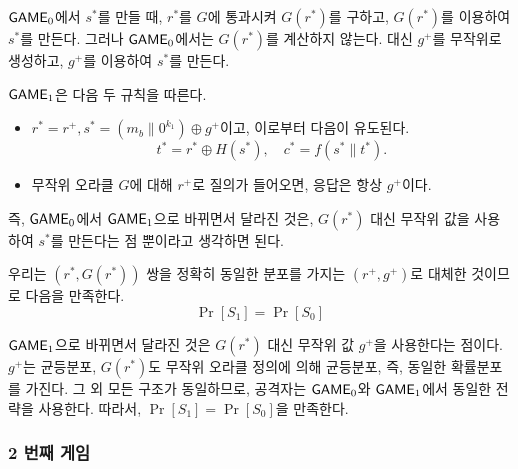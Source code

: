 \begin{memo}
	$\textsf{GAME}_0$에서 $s^*$를 만들 때, $r^*$를 $G$에 통과시켜 $G(r^*)$를 구하고,
	$G(r^*)$를 이용하여 $s^*$를 만든다. 그러나 $\textsf{GAME}_0$에서는 $G(r^*)$를
	계산하지 않는다. 대신 $g^+$를 무작위로 생성하고, $g^+$를 이용하여 $s^*$를
	만든다.
\end{memo}

$\textsf{GAME}_1$은 다음 두 규칙을 따른다.
\begin{itemize}
	\item $r^* = r^+, s^* = (m_b \parallel 0^{k_1}) \oplus g^+$이고, 이로부터
	다음이 유도된다.
	$$
		t^* = r^* \oplus H(s^*), \quad
		c^* = f(s^* \parallel t^*).
	$$
	\item 무작위 오라클 $G$에 대해 $r^+$로 질의가 들어오면, 응답은 항상 $g^+$이다.
\end{itemize}

\begin{memo}
	즉, $\textsf{GAME}_0$에서 $\textsf{GAME}_1$으로 바뀌면서 달라진 것은, $G(r^*)$ 대신 무작위
	값을 사용하여 $s^*$를 만든다는 점 뿐이라고 생각하면 된다.
\end{memo}

우리는 $(r^*, G(r^*))$ 쌍을 정확히 동일한 분포를 가지는 $(r^+, g^+)$로 대체한
것이므로 다음을 만족한다.
$$
	\Pr[S_1] = \Pr[S_0]
$$

\begin{memo}
	$\textsf{GAME}_1$으로 바뀌면서 달라진 것은 $G(r^*)$ 대신 무작위 값 $g^+$을
	사용한다는 점이다. $g^+$는 균등분포, $G(r^*)$도 무작위 오라클 정의에 의해
	균등분포, 즉, 동일한 확률분포를 가진다. 그 외 모든 구조가 동일하므로,
	공격자는 $\textsf{GAME}_0$와 $\textsf{GAME}_1$에서 동일한 전략을 사용한다. 따라서, $\Pr[S_1]
	= \Pr[S_0]$을 만족한다.
\end{memo}

\newpage
\subsubsection{2 번째 게임}

